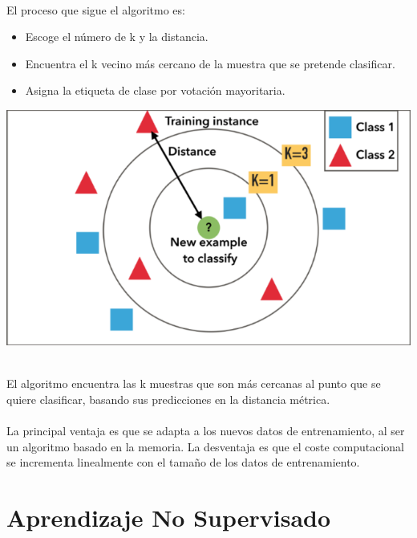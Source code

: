 \documentclass[11pt,a4paper]{article}
\begin{document}
\begin{enumerate}[A.]
             \\El proceso que sigue el algoritmo es:\\
            
            \begin{itemize}
			    \item Escoge el número de k y la distancia.
			    \item Encuentra el k vecino más cercano de la muestra que se pretende clasificar.
			    \item Asigna la etiqueta de clase por votación mayoritaria.
		    \end{itemize}
		    
		    \begin{center}
		    \includegraphics[scale=0.5]{./Imagenes/KNN}
		    \end{center}

            \\El algoritmo encuentra las k muestras que son más cercanas al punto que se quiere clasificar, basando sus predicciones en la distancia métrica.\\

            \\La principal ventaja es que se adapta a los nuevos datos de entrenamiento, al ser un algoritmo basado en la memoria. La desventaja es que el coste computacional se incrementa linealmente con el tamaño de los datos de entrenamiento.\\

			\end{enumerate}
	    
	    \newpage
	    
	    \section{Aprendizaje No Supervisado}
		
\end{document}
